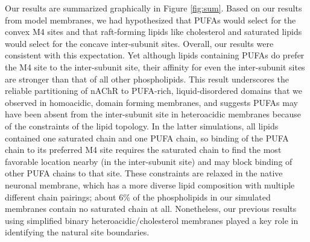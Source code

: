 \documentclass[%
 aip,
 amsmath,amssymb,
 preprint,%
]{revtex4-1}\usepackage{setspace}
\newcommand{\nachr}{nAChR}
\begin{document}
Our results are summarized graphically in Figure \ref{fig:sum}. Based on our results from model membranes, we had hypothesized that
 PUFAs would select for the convex M4 sites and that raft-forming lipids like cholesterol and saturated lipids would select for the concave inter-subunit sites. Overall, our results were consistent with this expectation.  Yet although lipids containing PUFAs do prefer the M4 site to the inter-subunit site, their affinity for even the inter-subunit sites are stronger than that of all other phospholipids. This result underscores the reliable partitioning of \nachr{} to PUFA-rich, liquid-disordered domains that we observed in homoacidic, domain forming membranes\cite{Sharp2019}, and suggests PUFAs may have been absent from the inter-subunit site in heteroacidic membranes\cite{Woods2019} because of the constraints of the lipid topology. In the latter simulations, all lipids contained one saturated chain and one PUFA chain, so binding of the PUFA chain to its preferred M4 site requires the saturated chain to find the most favorable location nearby (in the inter-subunit site) and may block binding of other PUFA chains to that site.  These constraints are relaxed in the native neuronal membrane, which has a more diverse lipid composition with multiple different chain pairings; about 6\% of the phospholipids in our simulated membranes contain no saturated chain at all. Nonetheless, our previous results\cite{Woods2019} using simplified binary heteroacidic/cholesterol membranes played a key role in identifying the natural site boundaries.  
\end{document}
